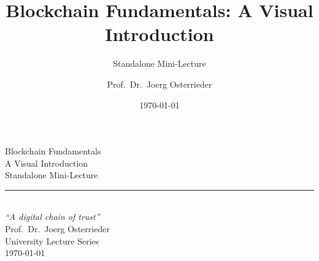 \documentclass[8pt,aspectratio=169]{beamer}
\title{Blockchain Fundamentals: A Visual Introduction}
\subtitle{Standalone Mini-Lecture}
\author{Prof.~Dr.~Joerg Osterrieder}
\institute{University Lecture Series}
\date{\today}
\begin{document}
\begin{frame}[plain]
\vspace{2cm}
\begin{center}
{\Huge\color{mlpurple} Blockchain Fundamentals}\\[0.4cm]
{\Large\color{mlblue} A Visual Introduction}\\[0.3cm]
{\normalsize Standalone Mini-Lecture}\\[0.3cm]
\textcolor{mlgray}{\rule{6cm}{0.4pt}}\\[0.3cm]
{\small\itshape ``A digital chain of trust''}\\[1.5cm]
{\normalsize Prof.~Dr.~Joerg Osterrieder}\\[0.2cm]
{\small University Lecture Series}\\[0.2cm]
{\small \today}
\end{center}
\end{frame}
\end{document}
